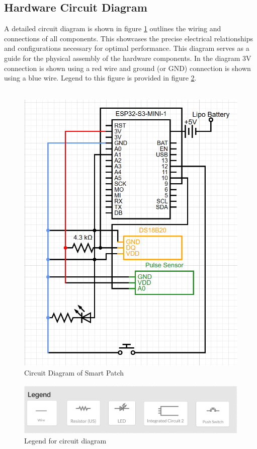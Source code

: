 \subsection{Hardware Circuit Diagram}
A detailed circuit diagram is shown in figure \ref{fig:full-circuit-diagram} outlines the wiring and connections of all components. This showcases the precise electrical relationships and configurations necessary for optimal performance. This diagram serves as a guide for the physical assembly of the hardware components. In the diagram 3V connection is shown using a red wire and ground (or GND) connection is shown using a blue wire. Legend to this figure is provided in figure \ref{fig:legend-circuit}. \\ \\
\begin{figure}[h!]
    \centering
    \includegraphics[width=0.8\linewidth]{images/full-circuit-diagram-2.png}
    \caption{Circuit Diagram of Smart Patch}
    \label{fig:full-circuit-diagram}
\end{figure}
\begin{figure}[h!]
    \centering
    \includegraphics[width=1\linewidth]{images/legend-circuit.png}
    \caption{Legend for circuit diagram}
    \label{fig:legend-circuit}
\end{figure}

